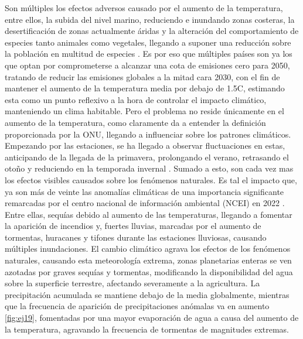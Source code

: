 Son múltiples los efectos adversos causado por el aumento de la temperatura, entre ellos, la subida del nivel marino, reduciendo e inundando zonas costeras, la desertificación de zonas actualmente áridas y la alteración del comportamiento de especies tanto animales como vegetales, llegando a suponer una reducción sobre la población en multitud de especies \cite{arnell2019global} \cite{new2011four}. Es por eso que múltiples países son ya los que optan por comprometerse a alcanzar una cota de emisiones cero para 2050, tratando de reducir las emisiones globales a la mitad cara 2030, con el fin de mantener el aumento de la temperatura media por debajo de 1.5\textdegree C, estimando esta como un punto reflexivo a la hora de controlar el impacto climático, manteniendo un clima habitable.\newline
\newline
Pero el problema no reside únicamente en el aumento de la temperatura, como claramente da a entender la definición proporcionada por la ONU, llegando a influenciar sobre los patrones climáticos. Empezando por las estaciones, se ha llegado a observar fluctuaciones en estas, anticipando de la llegada de la primavera, prolongando el verano, retrasando el otoño y reduciendo en la temporada invernal \cite{sparks2002observed}.\newline
\newline
Sumado a esto, son cada vez mas los efectos visibles causados sobre los fenómenos naturales. Es tal el impacto que, ya son más de veinte las anomalías climáticas de una importancia significante remarcadas por el centro nacional de información ambiental (NCEI) en 2022 \cite{NCEIWeb}. Entre ellas, sequías debido al aumento de las temperaturas, llegando a fomentar la aparición de incendios y, fuertes lluvias, marcadas por el aumento de tormentas, huracanes y tifones durante las estaciones lluviosas, causando múltiples inundaciones.\newline
\newline
El cambio climático agrava los efectos de los fenómenos naturales, causando esta meteorología extrema, zonas planetarias enteras se ven azotadas por graves sequías y tormentas, modificando la disponibilidad del agua sobre la superficie terrestre, afectando severamente a la agricultura. La precipitación acumulada se mantiene debajo de la media globalmente, mientras que la frecuencia de aparición de precipitaciones anómalas va en aumento \ref{fig:ej19}, fomentadas por una mayor evaporación de agua a causa del aumento de la temperatura, agravando la frecuencia de tormentas de magnitudes extremas. 

